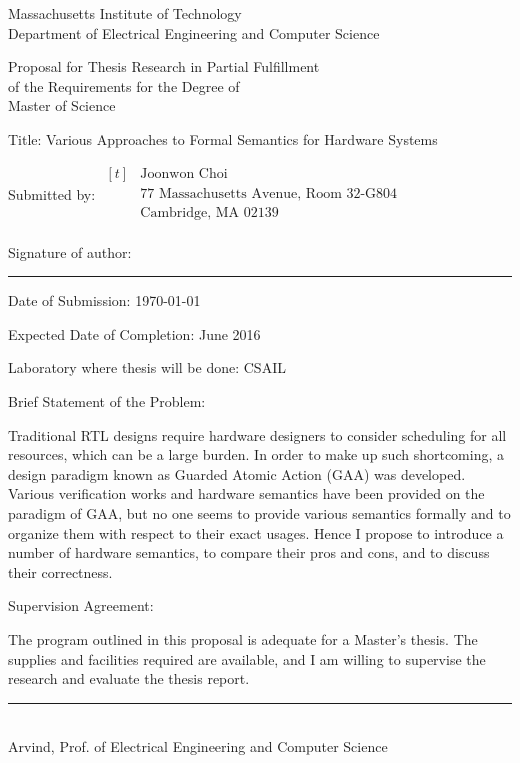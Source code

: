 
\begin{center}
  Massachusetts Institute of Technology\\
  Department of Electrical Engineering and Computer Science\dbsp

  Proposal for Thesis Research in Partial Fulfillment\\
  of the Requirements for the Degree of\\
  Master of Science\dbsp
\end{center}

{\parindent0pt

  Title: Various Approaches to Formal Semantics for Hardware Systems\dbsp

  Submitted by: $\begin{aligned}[t]
    &\textrm{Joonwon Choi}\\
    &\textrm{77 Massachusetts Avenue, Room 32-G804}\\
    &\textrm{Cambridge, MA 02139}\\
  \end{aligned}$\dbsp

  Signature of author: \rule{10cm}{0.4pt}\dbsp

  Date of Submission: \today\dbsp

  Expected Date of Completion: June 2016\dbsp

  Laboratory where thesis will be done: CSAIL\dbsp

  Brief Statement of the Problem:


  Traditional RTL designs require hardware designers to consider
  scheduling for all resources, which can be a large burden. In order
  to make up such shortcoming, a design paradigm known as Guarded
  Atomic Action (GAA) was developed. Various verification works and
  hardware semantics have been provided on the paradigm of GAA, but no
  one seems to provide various semantics formally and to organize them
  with respect to their exact usages. Hence I propose to introduce a
  number of hardware semantics, to compare their pros and cons, and to
  discuss their correctness.\dbsp

  Supervision Agreement:

  The program outlined in this proposal is adequate for a Master's
  thesis. The supplies and facilities required are available, and I am
  willing to supervise the research and evaluate the thesis
  report.\dbsp
}

\begin{flushright}
  \rule{10cm}{0.4pt}\\
  Arvind, Prof. of Electrical Engineering and Computer Science
\end{flushright}

\newpage
